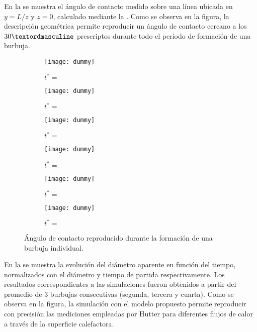 En la  se muestra el \'angulo de contacto medido sobre una l\'inea ubicada en $y=L/z$ y $z=0$, calculado mediante la . Como se observa en la figura, la descripci\'on geom\'etrica permite reproducir un \'angulo de contacto cercano a los $30\textordmasculine$ prescriptos durante todo el per\'iodo de formaci\'on de una burbuja.

\begin{figure}[htb]
    \centering
    \begin{subfigure}[t]{0.45\textwidth}
        \centering
        \texttt{[image: dummy]}
        \caption{$t^*=$}
    \end{subfigure}
    \begin{subfigure}[t]{0.45\textwidth}
        \centering
        \texttt{[image: dummy]}
        \caption{$t^*=$}
    \end{subfigure}
    \begin{subfigure}[t]{0.45\textwidth}
        \centering
        \texttt{[image: dummy]}
        \caption{$t^*=$}
    \end{subfigure}
    \begin{subfigure}[t]{0.45\textwidth}
        \centering
        \texttt{[image: dummy]}
        \caption{$t^*=$}
    \end{subfigure}
    \begin{subfigure}[t]{0.45\textwidth}
        \centering
        \texttt{[image: dummy]}
        \caption{$t^*=$}
    \end{subfigure}
    \begin{subfigure}[t]{0.45\textwidth}
        \centering
        \texttt{[image: dummy]}
        \caption{$t^*=$}
    \end{subfigure}            
    \caption{\'Angulo de contacto reproducido durante la formaci\'on de una burbuja individual.}
    \label{fig:evolucion contacto}
\end{figure}
\FloatBarrier 

En la  se muestra la evoluci\'on del di\'ametro aparente en funci\'on del tiempo, normalizados con el di\'ametro y tiempo de partida respectivamente. Los resultados correspondientes a las simulaciones fueron obtenidos a partir del promedio de 3 burbujas consecutivas (segunda, tercera y cuarta). Como se observa en la figura, la simulaci\'on con el modelo propuesto permite reproducir con precisi\'on las mediciones empleadas por Hutter para diferentes flujos de calor a trav\'es de la superficie calefactora.


